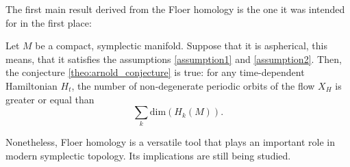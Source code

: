 The first main result derived from the Floer homology is the one it was intended for in the first place:

\begin{rmrk}
Let $M$ be a compact, symplectic manifold. Suppose that it is aspherical, this means, that it satisfies the assumptions \ref{assumption1} and \ref{assumption2}. Then, the conjecture \ref{theo:arnold_conjecture} is true: for any time-dependent Hamiltonian $H_t$, the number of non-degenerate periodic orbits of the flow $X_H$ is greater or equal than
\[\sum_k \mathrm{dim}(H_k(M)) .\]
\end{rmrk}

Nonetheless, Floer homology is a versatile tool that plays an important role in modern symplectic topology. Its implications are still being studied.

